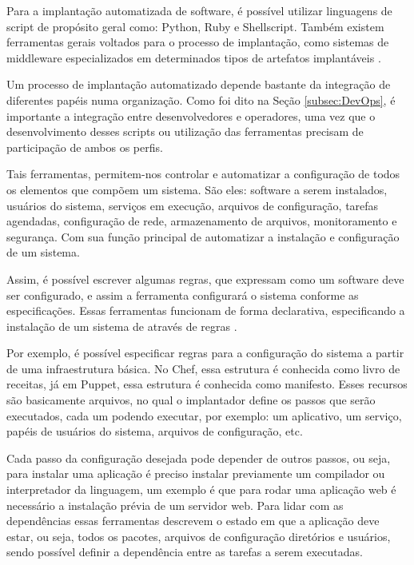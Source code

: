 Para a implantação automatizada de software, é
possível utilizar linguagens de script de propósito
geral como: Python, Ruby e Shellscript. Também existem ferramentas gerais 
voltados para o processo de implantação, como sistemas de middleware 
especializados em determinados tipos de artefatos implantáveis \cite{leo2014}.

Um processo de implantação automatizado depende bastante da integração de diferentes papéis
numa organização. Como foi dito na Seção \ref{subsec:DevOps}, é importante a
integração entre desenvolvedores e operadores, uma vez que o desenvolvimento desses
scripts ou utilização das ferramentas precisam de participação de ambos os perfis.

Tais ferramentas, permitem-nos controlar e automatizar a configuração de todos os 
elementos que compõem um sistema. São eles: software a serem instalados,
usuários do sistema, serviços em execução, arquivos de configuração, tarefas agendadas,
configuração de rede, armazenamento de arquivos, monitoramento e segurança. Com 
sua função principal de automatizar a instalação e configuração de um 
sistema. 

Assim, é possível escrever algumas regras, que expressam como um software deve 
ser configurado, e assim a ferramenta configurará o sistema conforme as 
especificações. Essas ferramentas funcionam de forma declarativa, 
especificando a instalação de um sistema de através de regras \cite{6265084}.

Por exemplo, é possível especificar regras para a configuração do sistema
a partir de uma infraestrutura básica. No Chef, essa estrutura é conhecida como livro
de receitas, já em Puppet, essa estrutura é conhecida como manifesto. Esses recursos
são basicamente arquivos, no qual o implantador define os passos que serão executados,
cada um podendo executar, por exemplo: um aplicativo, um serviço, papéis de usuários do sistema,
arquivos de configuração, etc.

Cada passo da configuração desejada pode depender de outros passos, ou seja, para
instalar uma aplicação é preciso instalar previamente um compilador ou interpretador
 da linguagem, um exemplo é que para rodar uma aplicação web é necessário a 
instalação prévia de um servidor web. Para lidar com as dependências essas 
ferramentas descrevem o estado em que a aplicação deve estar, ou seja, 
todos os pacotes, arquivos de configuração diretórios e usuários, sendo possível 
definir a dependência entre as tarefas a serem executadas.

